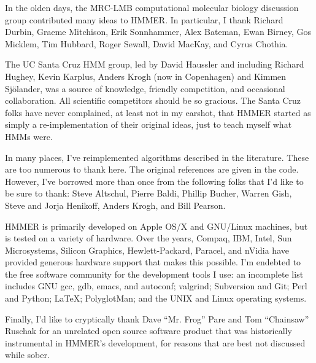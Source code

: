 In the olden days, the MRC-LMB computational molecular biology
discussion group contributed many ideas to HMMER. In particular, I
thank Richard Durbin, Graeme Mitchison, Erik Sonnhammer, Alex Bateman,
Ewan Birney, Gos Micklem, Tim Hubbard, Roger Sewall, David MacKay, and
Cyrus Chothia.

The UC Santa Cruz HMM group, led by David Haussler and including
Richard Hughey, Kevin Karplus, Anders Krogh (now in Copenhagen) and
Kimmen Sj\"{o}lander, was a source of knowledge, friendly competition,
and occasional collaboration. All scientific competitors should be so
gracious. The Santa Cruz folks have never complained, at least not in
my earshot, that HMMER started as simply a re-implementation of their
original ideas, just to teach myself what HMMs were.

In many places, I've reimplemented algorithms described in the
literature. These are too numerous to thank here. The original
references are given in the code. However, I've borrowed more than
once from the following folks that I'd like to be sure to thank: Steve
Altschul, Pierre Baldi, Phillip Bucher, Warren Gish, Steve and Jorja
Henikoff, Anders Krogh, and Bill Pearson.

HMMER is primarily developed on Apple OS/X and GNU/Linux machines, but
is tested on a variety of hardware. Over the years, Compaq, IBM,
Intel, Sun Microsystems, Silicon Graphics, Hewlett-Packard, Paracel,
and nVidia have provided generous hardware support that makes this
possible. I'm endebted to the free software community for the
development tools I use: an incomplete list includes GNU gcc, gdb,
emacs, and autoconf; valgrind; Subversion and Git; Perl and Python;
\LaTeX; PolyglotMan; and the UNIX and Linux operating systems.

Finally, I'd like to cryptically thank Dave ``Mr. Frog'' Pare and Tom
``Chainsaw'' Ruschak for an unrelated open source software product
that was historically instrumental in HMMER's development, for reasons
that are best not discussed while sober.



